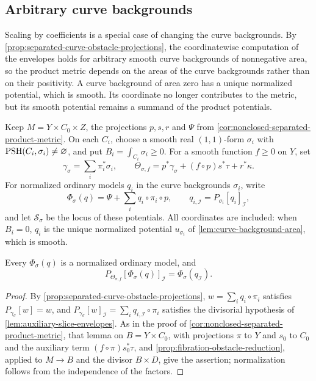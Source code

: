 \subsection{Arbitrary curve backgrounds}
\label{subsec:arbitrary-curve-product-metrics}

Scaling by coefficients is a special case of changing the curve backgrounds. By \cref{prop:separated-curve-obstacle-projections}, the coordinatewise computation of the envelopes holds for arbitrary smooth curve backgrounds of nonnegative area, so the product metric depends on the areas of the curve backgrounds rather than on their positivity. A curve background of area zero has a unique normalized potential, which is smooth. Its coordinate no longer contributes to the metric, but its smooth potential remains a summand of the product potentials.

Keep $M=Y\times C_0\times Z$, the projections $p,s,r$ and $\Psi$ from \cref{cor:nonclosed-separated-product-metric}. On each $C_i$, choose a smooth real $(1,1)$-form $\sigma_i$ with $\mathrm{PSH}(C_i,\sigma_i)\ne\varnothing$, and put $B_i=\int_{C_i}\sigma_i\geq0$. For a smooth function $f\geq0$ on $Y$, set
\[
 \gamma_\sigma=\sum_i\pi_i^*\sigma_i,\qquad
 \Theta_{\sigma,f}=p^*\gamma_\sigma+(f\circ p)s^*\tau+r^*\kappa.
\]
For normalized ordinary models $q_i$ in the curve backgrounds $\sigma_i$, write
\[
 \Phi_\sigma(q)=\Psi+\sum_i q_i\circ\pi_i\circ p,
 \qquad q_{i,\mathcal I}=P_{\sigma_i}[q_i]_{\mathcal I},
\]
and let $\mathcal S_\sigma$ be the locus of these potentials. All coordinates are included: when $B_i=0$, $q_i$ is the unique normalized potential $u_{\sigma_i}$ of \cref{lem:curve-background-area}, which is smooth.

\begin{lemma}\label{lem:arbitrary-product-model-projections}
Every $\Phi_\sigma(q)$ is a normalized ordinary model, and
\[
 P_{\Theta_{\sigma,f}}[\Phi_\sigma(q)]_{\mathcal I}
       =\Phi_\sigma(q_{\mathcal I}).
\]
\end{lemma}
\begin{proof}
By \cref{prop:separated-curve-obstacle-projections}, $w=\sum_iq_i\circ\pi_i$ satisfies $P_{\gamma_\sigma}[w]=w$, and $P_{\gamma_\sigma}[w]_{\mathcal I}=\sum_iq_{i,\mathcal I}\circ\pi_i$ satisfies the divisorial hypothesis of \cref{lem:auxiliary-slice-envelopes}. As in the proof of \cref{cor:nonclosed-separated-product-metric}, that lemma on $B=Y\times C_0$, with projections $\pi$ to $Y$ and $s_0$ to $C_0$ and the auxiliary term $(f\circ\pi)s_0^*\tau$, and \cref{prop:fibration-obstacle-reduction}, applied to $M\to B$ and the divisor $B\times D$, give the assertion; normalization follows from the independence of the factors.
\end{proof}


